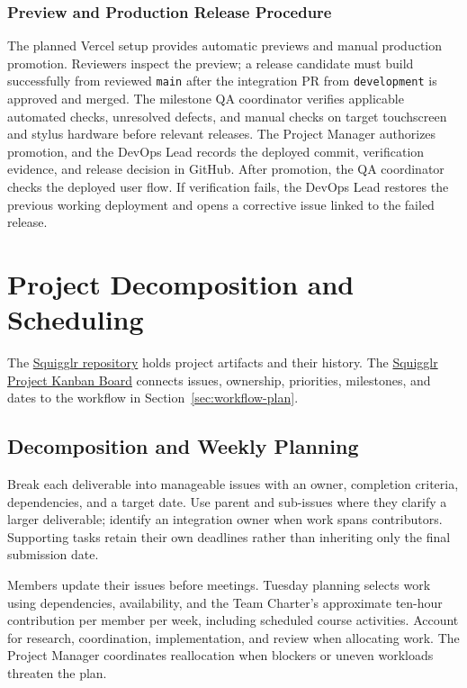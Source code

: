 \documentclass{article}
\begin{document}
\subsubsection*{Preview and Production Release Procedure}
The planned Vercel setup provides automatic previews and manual production
promotion. Reviewers inspect the preview; a release candidate must build
successfully from reviewed \texttt{main} after the integration PR from
\texttt{development} is approved and merged. The milestone QA coordinator
verifies applicable automated checks, unresolved defects, and manual checks
on target touchscreen and stylus hardware before relevant releases. The
Project Manager authorizes promotion, and the DevOps Lead records the deployed
commit, verification evidence, and release decision in GitHub. After promotion,
the QA coordinator checks the deployed user flow. If verification fails,
the DevOps Lead restores the previous working deployment and opens a
corrective issue linked to the failed release.

\section{Project Decomposition and Scheduling}

\label{sec:scheduling}

The \href{https://github.com/AHMEDELZARIA/squigglr}{Squigglr repository}
holds project artifacts and their history. The
\href{https://github.com/users/AHMEDELZARIA/projects/4}
{Squigglr Project Kanban Board} connects issues, ownership, priorities,
milestones, and dates to the workflow in Section~\ref{sec:workflow-plan}.

\subsection{Decomposition and Weekly Planning}

Break each deliverable into manageable issues with an owner, completion
criteria, dependencies, and a target date. Use parent and sub-issues where
they clarify a larger deliverable; identify an integration owner when work
spans contributors. Supporting tasks retain their own deadlines rather than
inheriting only the final submission date.

Members update their issues before meetings. Tuesday planning selects work
using dependencies, availability, and the Team Charter's approximate
ten-hour contribution per member per week, including scheduled course
activities. Account for research, coordination, implementation, and review
when allocating work. The Project Manager coordinates reallocation when
blockers or uneven workloads threaten the plan.
\end{document}
